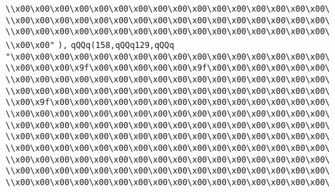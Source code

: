 \verb|\\x00\x00\x00\x00\x00\x00\x00\x00\x00\x00\x00\x00\x00\x00\x00\x00\|\newline
\verb|\\x00\x00\x00\x00\x00\x00\x00\x00\x00\x00\x00\x00\x00\x00\x00\x00\|\newline
\verb|\\x00\x00\x00\x00\x00\x00\x00\x00\x00\x00\x00\x00\x00\x00\x00\x00\|\newline
\verb|\\x00\x00"|\newline
\verb|),|\newline
\verb|qQQq(158,qQQq129,qQQq|\newline
\verb|"\x00\x00\x00\x00\x00\x00\x00\x00\x00\x00\x00\x00\x00\x00\x00\x00\|\newline
\verb|\\x00\x00\x00\x9f\x00\x00\x00\x00\x00\x9f\x00\x00\x00\x00\x00\x00\|\newline
\verb|\\x00\x00\x00\x00\x00\x00\x00\x00\x00\x00\x00\x00\x00\x00\x00\x00\|\newline
\verb|\\x00\x00\x00\x00\x00\x00\x00\x00\x00\x00\x00\x00\x00\x00\x00\x00\|\newline
\verb|\\x00\x9f\x00\x00\x00\x00\x00\x00\x00\x00\x00\x00\x00\x00\x00\x00\|\newline
\verb|\\x00\x00\x00\x00\x00\x00\x00\x00\x00\x00\x00\x00\x00\x00\x00\x00\|\newline
\verb|\\x00\x00\x00\x00\x00\x00\x00\x00\x00\x00\x00\x00\x00\x00\x00\x00\|\newline
\verb|\\x00\x00\x00\x00\x00\x00\x00\x00\x00\x00\x00\x00\x00\x00\x00\x00\|\newline
\verb|\\x00\x00\x00\x00\x00\x00\x00\x00\x00\x00\x00\x00\x00\x00\x00\x00\|\newline
\verb|\\x00\x00\x00\x00\x00\x00\x00\x00\x00\x00\x00\x00\x00\x00\x00\x00\|\newline
\verb|\\x00\x00\x00\x00\x00\x00\x00\x00\x00\x00\x00\x00\x00\x00\x00\x00\|\newline
\verb|\\x00\x00\x00\x00\x00\x00\x00\x00\x00\x00\x00\x00\x00\x00\x00\x00\|\newline
